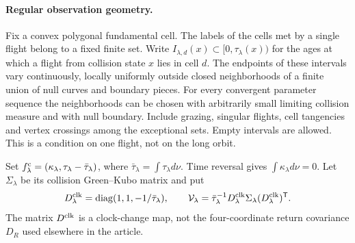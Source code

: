 \paragraph{Regular observation geometry.}
Fix a convex polygonal fundamental cell. The labels of the cells met
by a single flight belong to a fixed finite set. Write
$I_{\lambda,d}(x)\subset[0,\tau_\lambda(x))$ for the ages at which a
flight from collision state $x$ lies in cell $d$. The endpoints of
these intervals vary continuously, locally uniformly outside closed
neighborhoods of a finite union of null curves and boundary pieces.
For every convergent parameter sequence the neighborhoods can be
chosen with arbitrarily small limiting collision measure and with
null boundary. Include grazing, singular flights, cell tangencies and
vertex crossings among the exceptional sets. Empty intervals are
allowed. This is a condition on one flight, not on the long orbit.

Set $f^{\rm c}_\lambda=(\kappa_\lambda,
\tau_\lambda-\bar\tau_\lambda)$, where
$\bar\tau_\lambda=\int\tau_\lambda d\nu$. Time reversal gives
$\int\kappa_\lambda d\nu=0$. Let $\Sigma_\lambda$ be its collision
Green--Kubo matrix and put
\begin{equation}\label{eq:v35-family-covariances}
 D^{\rm clk}_\lambda=\operatorname{diag}(1,1,-1/\bar\tau_\lambda),
 \qquad
 \mathcal V_\lambda=\bar\tau_\lambda^{-1}
       D^{\rm clk}_\lambda\Sigma_\lambda(D^{\rm clk}_\lambda)^{\mathsf T}.
\end{equation}
The matrix $D^{\rm clk}$ is a clock-change map, not the four-coordinate
return covariance $D_R$ used elsewhere in the article.

